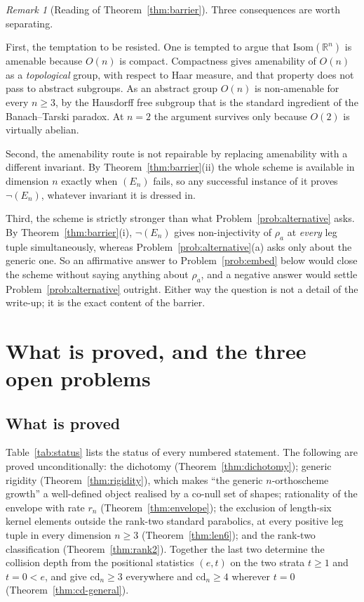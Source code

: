 \documentclass[11pt,a4paper]{article}
\newcommand{\R}{\mathbb{R}}
\newcommand{\Isom}{\mathrm{Isom}}
\newcommand{\cd}{\mathrm{cd}}
\theoremstyle{definition}
\theoremstyle{remark}
\newtheorem{remark}[theorem]{Remark}
\theoremstyle{plain}
\begin{document}
\begin{remark}[Reading of Theorem~\ref{thm:barrier}]\label{rem:amenability-fails}
Three consequences are worth separating.

First, the temptation to be resisted. One is tempted to argue that $\Isom(\R^n)$ is amenable
because $O(n)$ is compact. Compactness gives amenability of $O(n)$ as a \emph{topological}
group, with respect to Haar measure, and that property does not pass to abstract subgroups. As
an abstract group $O(n)$ is non-amenable for every $n\ge3$, by the Hausdorff free subgroup that
is the standard ingredient of the Banach--Tarski paradox. At $n=2$ the argument survives only
because $O(2)$ is virtually abelian.

Second, the amenability route is not repairable by replacing amenability with a different
invariant. By Theorem~\ref{thm:barrier}(ii) the whole scheme is available in dimension $n$
exactly when $(E_n)$ fails, so any successful instance of it proves $\neg(E_n)$, whatever
invariant it is dressed in.

Third, the scheme is strictly stronger than what Problem~\ref{prob:alternative} asks. By
Theorem~\ref{thm:barrier}(i), $\neg(E_n)$ gives non-injectivity of $\rho_a$ at \emph{every}
leg tuple simultaneously, whereas Problem~\ref{prob:alternative}(a) asks only about the generic
one. So an affirmative answer to Problem~\ref{prob:embed} below would close the scheme without
saying anything about $\rho_a$, and a negative answer would settle
Problem~\ref{prob:alternative} outright. Either way the question is not a detail of the
write-up; it is the exact content of the barrier.
\end{remark}

\section{What is proved, and the three open problems}\label{sec:open}

\subsection{What is proved}

Table~\ref{tab:status} lists the status of every numbered statement. The following are proved
unconditionally: the dichotomy (Theorem~\ref{thm:dichotomy}); generic rigidity
(Theorem~\ref{thm:rigidity}), which makes ``the generic $n$-orthoscheme growth'' a well-defined
object realised by a co-null set of shapes; rationality of the envelope with rate $r_n$
(Theorem~\ref{thm:envelope}); the exclusion of length-six kernel elements outside the rank-two
standard parabolics, at every positive leg tuple in every dimension $n\ge3$
(Theorem~\ref{thm:len6}); and the rank-two classification (Theorem~\ref{thm:rank2}). Together
the last two determine the collision depth from the positional statistics $(e,t)$ on the two
strata $t\ge1$ and $t=0<e$, and give $\cd_n\ge3$ everywhere and $\cd_n\ge4$ wherever $t=0$
(Theorem~\ref{thm:cd-general}).
\end{document}
